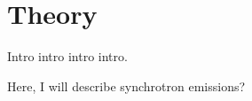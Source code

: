 \chapter{Theory}
\begin{chapabstract}

Intro intro intro intro.

\end{chapabstract}

Here, I will describe synchrotron emissions?
